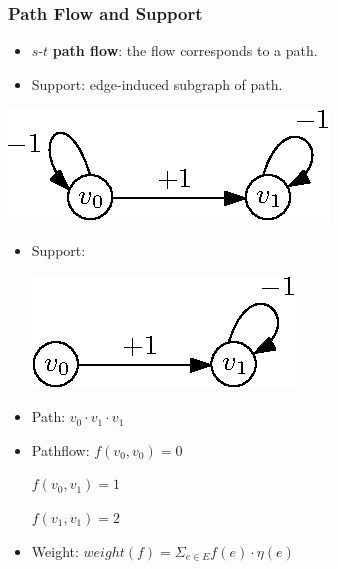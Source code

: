 \documentclass[11pt]{beamer}
\begin{document}
\begin{frame}\frametitle{Path Flow and Support}


\begin{itemize}

\item  $s$-$t$ \textbf{path flow}: the flow corresponds to a path.

\item Support: edge-induced subgraph of path.
\end{itemize}
\pause

\begin{example}
\begin{multicols}{2}

\includegraphics[scale=1]{wg2.eps}
\begin{itemize}

\item Support: 

\includegraphics[scale=1]{support.eps}

\item Path: $v_0\cdot v_1\cdot v_1$

\item Pathflow: $f(v_0,v_0) = 0$ 

$f(v_0,v_1) = 1$

$ f(v_1,v_1) = 2$

\item Weight: $weight(f) = \Sigma_{e\in E} f(e)\cdot \eta(e)$
\end{itemize}
\end{multicols}

\end{example}


\end{frame}
\end{document}
